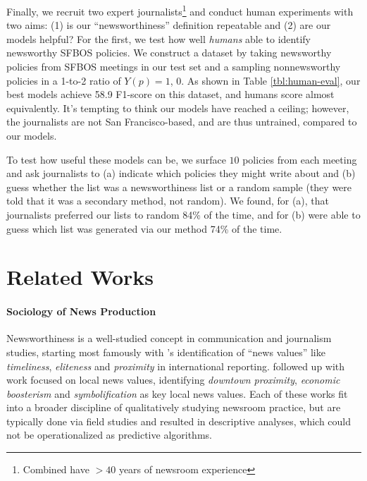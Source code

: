 \documentclass[11pt]{article}
\begin{document}
Finally, we recruit two expert journalists\footnote{Combined have $>40$ years of newsroom experience} and conduct human experiments with two aims: (1) is our ``newsworthiness'' definition repeatable and (2) are our models helpful? For the first, we test how well \textit{humans} able to identify newsworthy SFBOS policies. We construct a dataset by taking newsworthy policies from SFBOS meetings in our test set and a sampling nonnewsworthy policies in a 1-to-2 ratio of $Y(p)=1$, $0$. As shown in Table \ref{tbl:human-eval}, our best models achieve 58.9 F1-score on this dataset, and humans score almost equivalently. It's tempting to think our models have reached a ceiling; however, the journalists are not San Francisco-based, and  are thus untrained, compared to our models.

To test how useful these models can be, we surface $10$ policies from each meeting and ask journalists to (a) indicate which policies they might write about and (b) guess whether the list was a newsworthiness list or a random sample (they were told that it was a secondary method, not random). We found, for (a), that journalists preferred our lists to random 84\% of the time, and for (b) were able to guess which list was generated via our method 74\% of the time.


\section{Related Works}

\paragraph{Sociology of News Production} Newsworthiness is a well-studied concept in communication and journalism studies, starting most famously with 's identification of ``news values'' like \textit{timeliness}, \textit{eliteness} and \textit{proximity} in international reporting.  followed up with work focused on local news values, identifying \textit{downtown proximity}, \textit{economic boosterism} and \textit{symbolification} as key local news values. Each of these works fit into a broader discipline of qualitatively studying newsroom practice, but are typically done via field studies and resulted in descriptive analyses, which could not be operationalized as predictive algorithms.
\end{document}
